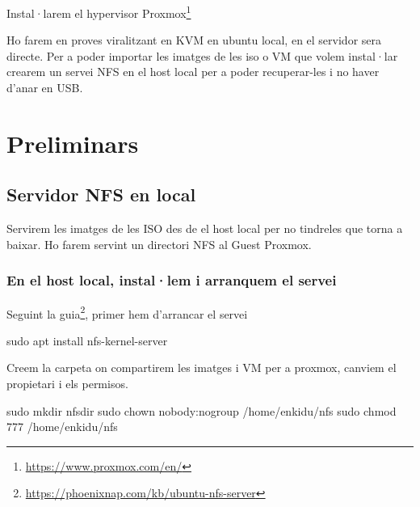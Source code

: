\documentclass[
  10pt,
]{krantz}
\newenvironment{Shaded}{\begin{snugshade}}{\end{snugshade}}
\newcommand{\FunctionTok}[1]{\textcolor[rgb]{0.00,0.00,0.00}{#1}}
\newcommand{\NormalTok}[1]{#1}
\DeclareRobustCommand{\href}[2]{#2\footnote{\url{#1}}}
\begin{document}
Instal·larem el hypervisor \href{https://www.proxmox.com/en/}{Proxmox}

Ho farem en proves viralitzant en KVM en ubuntu local, en el servidor sera directe. Per a poder importar les imatges de les iso o VM que volem instal·lar crearem un servei NFS en el host local per a poder recuperar-les i no haver d'anar en USB.

\hypertarget{preliminars}{%
\section{Preliminars}\label{preliminars}}

\hypertarget{servidor-nfs-en-local}{%
\subsection{Servidor NFS en local}\label{servidor-nfs-en-local}}

Servirem les imatges de les ISO des de el host local per no tindreles que torna a baixar. Ho farem servint un directori NFS al Guest Proxmox.

\hypertarget{en-el-host-local-installem-i-arranquem-el-servei}{%
\subsubsection{En el host local, instal·lem i arranquem el servei}\label{en-el-host-local-installem-i-arranquem-el-servei}}

Seguint la \href{https://phoenixnap.com/kb/ubuntu-nfs-server}{guia}, primer hem d'arrancar el servei

\begin{Shaded}
\begin{Highlighting}[]
\FunctionTok{sudo}\NormalTok{ apt install nfs{-}kernel{-}server}
\end{Highlighting}
\end{Shaded}

Creem la carpeta on compartirem les imatges i VM per a proxmox, canviem el propietari i els permisos.

\begin{Shaded}
\begin{Highlighting}[]
\FunctionTok{sudo}\NormalTok{ mkdir nfsdir}
\FunctionTok{sudo}\NormalTok{ chown nobody:nogroup /home/enkidu/nfs}
\FunctionTok{sudo}\NormalTok{ chmod 777 /home/enkidu/nfs}
\end{Highlighting}
\end{Shaded}
\end{document}
